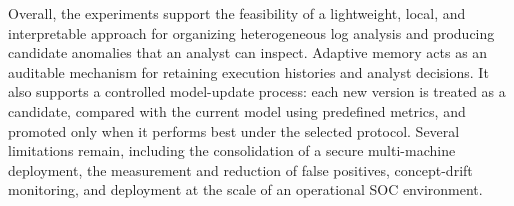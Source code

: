 \documentclass[12pt,a4paper,oneside]{report}
\begin{document}
Overall, the experiments support the feasibility of a lightweight, local, and interpretable approach for organizing heterogeneous log analysis and producing candidate anomalies that an analyst can inspect. Adaptive memory acts as an auditable mechanism for retaining execution histories and analyst decisions. It also supports a controlled model-update process: each new version is treated as a candidate, compared with the current model using predefined metrics, and promoted only when it performs best under the selected protocol. Several limitations remain, including the consolidation of a secure multi-machine deployment, the measurement and reduction of false positives, concept-drift monitoring, and deployment at the scale of an operational SOC environment.

\tableofcontents
\listoffigures
\listoftables



\clearpage
{}














\end{document}
